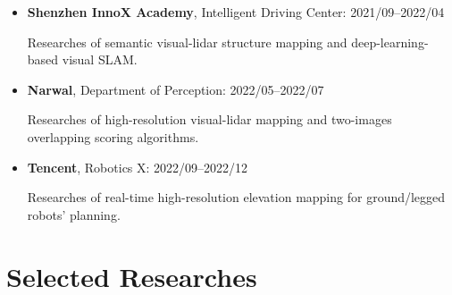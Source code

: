 \documentclass[11pt,a4paper,sans]{moderncv}        %
\begin{document}
\begin{itemize}

\item{\textbf{Shenzhen InnoX Academy}, Intelligent Driving Center: 2021/09--2022/04

Researches of semantic visual-lidar structure mapping and deep-learning-based visual SLAM.}

\item{\textbf{Narwal}, Department of Perception: 2022/05--2022/07

Researches of high-resolution visual-lidar mapping and two-images overlapping scoring algorithms.}

\item{\textbf{Tencent}, Robotics X: 2022/09--2022/12

Researches of real-time high-resolution elevation mapping for ground/legged robots' planning.
}

\end{itemize}

\section{Selected Researches}
\end{document}
